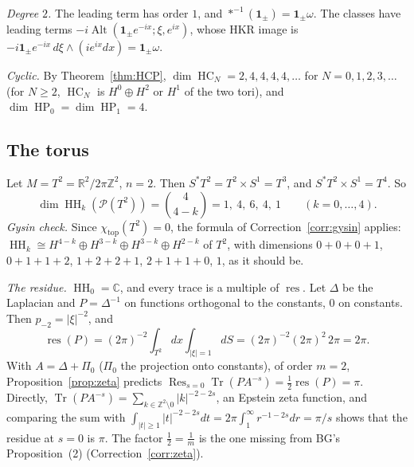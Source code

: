 \documentclass[11pt,oneside,reqno]{article}
\DeclareMathOperator{\HH}{HH}
\DeclareMathOperator{\HC}{HC}
\DeclareMathOperator{\HP}{HP}
\DeclareMathOperator{\Tr}{Tr}
\DeclareMathOperator{\res}{res}
\DeclareMathOperator{\Res}{Res}
\newcommand{\C}{\mathbb C}
\newcommand{\R}{\mathbb R}
\newcommand{\Z}{\mathbb Z}
\newcommand{\cP}{\mathcal P}
\theoremstyle{plain}
\theoremstyle{definition}
\theoremstyle{remark}
\begin{document}
\emph{Degree \(2\).} The leading term has order \(1\), and \(*^{-1}(\mathbf 1_\pm)=\mathbf 1_\pm\omega\). The classes have leading
terms \(-i\operatorname{Alt}(\mathbf 1_\pm e^{-ix};\xi,e^{ix})\), whose HKR image is
\(-i\mathbf 1_\pm e^{-ix}\,d\xi\wedge(ie^{ix}dx)=\mathbf 1_\pm\omega\).

\emph{Cyclic.} By Theorem~\ref{thm:HCP}, \(\dim\HC_N=2,4,4,4,4,\dots\) for \(N=0,1,2,3,\dots\) (for
\(N\ge2\), \(\HC_N\) is \(H^0\oplus H^2\) or \(H^1\) of the two tori), and \(\dim\HP_0=\dim\HP_1=4\).

\subsection{The torus}\label{subsec:exT2}
Let \(M=T^2=\R^2/2\pi\Z^2\), \(n=2\). Then \(S^*T^2=T^2\times S^1=T^3\), and \(S^*T^2\times S^1=T^4\). So
\[
 \dim\HH_k(\cP(T^2))=\binom4{4-k}=1,\ 4,\ 6,\ 4,\ 1\qquad(k=0,\dots,4).
\]
\emph{Gysin check.} Since \(\chi_{\mathrm{top}}(T^2)=0\), the formula of Correction~\ref{corr:gysin} applies:
\(\HH_k\cong H^{4-k}\oplus H^{3-k}\oplus H^{3-k}\oplus H^{2-k}\) of \(T^2\), with dimensions
\(0+0+0+1\), \(0+1+1+2\), \(1+2+2+1\), \(2+1+1+0\), \(1\), as it should be.

\emph{The residue.} \(\HH_0=\C\), and every trace is a multiple of \(\res\). Let \(\Delta\) be the Laplacian
and \(P=\Delta^{-1}\) on functions orthogonal to the constants, \(0\) on constants. Then
\(p_{-2}=|\xi|^{-2}\), and
\[
 \res(P)=(2\pi)^{-2}\int_{T^2}dx\int_{|\xi|=1}dS=(2\pi)^{-2}(2\pi)^2\,2\pi=2\pi .
\]
With \(A=\Delta+\Pi_0\) (\(\Pi_0\) the projection onto constants), of order \(m=2\),
Proposition~\ref{prop:zeta} predicts \(\Res_{s=0}\Tr(PA^{-s})=\frac12\res(P)=\pi\). Directly,
\(\Tr(PA^{-s})=\sum_{k\in\Z^2\setminus0}|k|^{-2-2s}\), an Epstein zeta function, and comparing the sum with
\(\int_{|t|\ge1}|t|^{-2-2s}dt=2\pi\int_1^\infty r^{-1-2s}dr=\pi/s\) shows that the residue at \(s=0\) is \(\pi\). The
factor \(\frac12=\frac1m\) is the one missing from BG's Proposition~(2)
(Correction~\ref{corr:zeta}).
\end{document}
